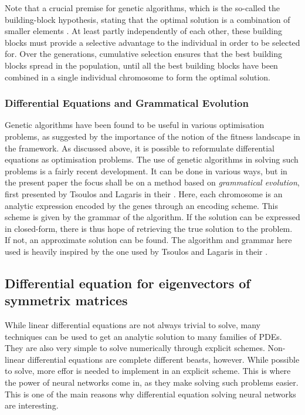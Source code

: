 \documentclass[multicolumn, 12pt]{extarticle}
\begin{document}
Note that a crucial premise for genetic algorithms, which is the so-called the building-block hypothesis, stating that the optimal solution is a combination of smaller elements \cite{Eyal}. At least partly independently of each other, these building blocks must provide a selective advantage to the individual in order to be selected for. Over the generations, cumulative selection ensures that the best building blocks spread in the population, until all the best building blocks have been combined in a single individual chromosome to form the optimal solution.


\subsubsection{Differential Equations and Grammatical Evolution}
Genetic algorithms have been found to be useful in various optimisation problems, as suggested by the importance of the notion of the fitness landscape in the framework. As discussed above, it is possible to reformulate differential equations as optimisation problems. The use of genetic algorithms in solving such problems is a fairly recent development. It can be done in various ways, but in the present paper the focus shall be on a method based on \textit{grammatical evolution}, first presented by Tsoulos and Lagaris in their \cite{Lagaris}. Here, each chromosome is an analytic expression encoded by the genes through an encoding scheme. This scheme is given by the grammar of the algorithm. If the solution can be expressed in closed-form, there is thus hope of retrieving the true solution to the problem. If not, an approximate solution can be found. The algorithm and grammar here used is heavily inspired by the one used by Tsoulos and Lagaris in their  \cite{Lagaris}.

\subsection{Differential equation for eigenvectors of symmetrix matrices}
While linear differential equations are not always trivial to solve, many techniques can be used to get an analytic solution to many families of PDEs. They are also very simple to solve numerically through explicit schemes. Non-linear differential equations are complete different beasts, however. While possible to solve, more effor is needed to implement in an explicit scheme. This is where the power of neural networks come in, as they make solving such problems easier. This is one of the main reasons why differential equation solving neural networks are interesting.
\end{document}
